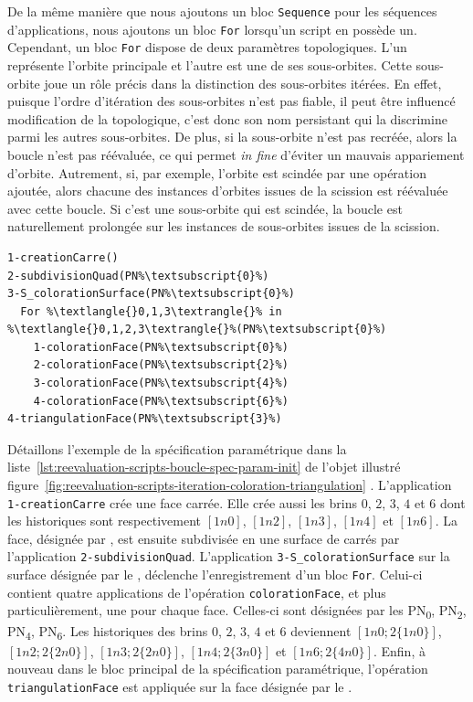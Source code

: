 De la même manière que nous ajoutons un bloc \texttt{Sequence} pour les
séquences d'applications, nous ajoutons un bloc \texttt{For} lorsqu'un script en
possède un. %
Cependant, un bloc \texttt{For} dispose de deux paramètres topologiques. %
L'un représente l'orbite principale et l'autre est une de ses sous-orbites. %
Cette sous-orbite joue un rôle précis dans la distinction des sous-orbites
itérées. %
En effet, puisque l'ordre d'itération des sous-orbites n'est pas fiable, il peut
être influencé modification de la topologique, c'est donc son nom persistant qui
la discrimine parmi les autres sous-orbites. %
De plus, si la sous-orbite n'est pas recréée, alors la boucle n'est pas
réévaluée, ce qui permet \textit{in fine} d'éviter un mauvais appariement
d'orbite. %
Autrement, si, par exemple, l'orbite est scindée par une opération ajoutée,
alors chacune des instances d'orbites issues de la scission est réévaluée avec
cette boucle. %
Si c'est une sous-orbite qui est scindée, la boucle est naturellement prolongée
sur les instances de sous-orbites issues de la scission. %

\begin{lstlisting}[style=script-style,
escapechar=\%,
caption=Spécification paramétrique avec boucle,
label=lst:reevaluation-scripts-boucle-spec-param-init]
1-creationCarre()
2-subdivisionQuad(PN%\textsubscript{0}%)
3-S_colorationSurface(PN%\textsubscript{0}%)
  For %\textlangle{}0,1,3\textrangle{}% in %\textlangle{}0,1,2,3\textrangle{}%(PN%\textsubscript{0}%)
    1-colorationFace(PN%\textsubscript{0}%)
    2-colorationFace(PN%\textsubscript{2}%)
    3-colorationFace(PN%\textsubscript{4}%)
    4-colorationFace(PN%\textsubscript{6}%)
4-triangulationFace(PN%\textsubscript{3}%)
\end{lstlisting}


Détaillons l'exemple de la spécification paramétrique dans la
liste~\ref{lst:reevaluation-scripts-boucle-spec-param-init} de l'objet illustré
figure~\ref{fig:reevaluation-scripts-iteration-coloration-triangulation} . %
L'application \texttt{1\allowbreak{}-\allowbreak{}creation\-Carre} crée une face
carrée. %
Elle crée aussi les brins \(0\), \(2\), \(3\), \(4\) et \(6\) dont les
historiques sont respectivement \([1n0]\), \([1n2]\), \([1n3]\), \([1n4]\) et
\([1n6]\). %
La face, désignée par , est ensuite subdivisée en une surface de
carrés par l'application
\texttt{2\allowbreak{}-\allowbreak{}subdivision\-Quad}. %
L'application
\texttt{3\allowbreak{}-\allowbreak{}S\allowbreak{}\_\allowbreak{}coloration\-Surface}
sur la surface désignée par le , déclenche l'enregistrement d'un
bloc \texttt{For}. %
Celui-ci contient quatre applications de l'opération \texttt{coloration\-Face},
et plus particulièrement, une pour chaque face. %
Celles-ci sont désignées par les PN\textsubscript{0}, PN\textsubscript{2},
PN\textsubscript{4}, PN\textsubscript{6}. %
Les historiques des brins \(0\), \(2\), \(3\), \(4\) et \(6\) deviennent
\([1n0;2\{1n0\}]\), \([1n2;2\{2n0\}]\), \([1n3;2\{2n0\}]\), \([1n4;2\{3n0\}]\)
et \([1n6;2\{4n0\}]\). %
Enfin, à nouveau dans le bloc principal de la spécification paramétrique,
l'opération \texttt{triangulation\-Face} est appliquée sur la face désignée par
le . %



